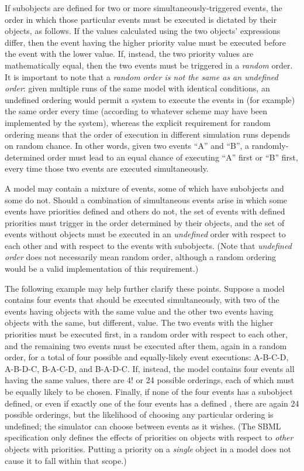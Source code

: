 If \Priority subobjects are defined for two or more
simultaneously-triggered events, the order in which those particular
events must be executed is dictated by their \Priority objects,
as follows.  If the values calculated using the two \Priority
objects'  expressions differ, then the event having
the higher priority value must be executed before the event with
the lower value.  If, instead, the two priority values are
mathematically equal, then the two events must be triggered in a
\emph{random} order.  It is important to note that a \emph{random
  order is not the same as an undefined order}: given multiple
runs of the same model with identical conditions, an undefined
ordering would permit a system to execute the events in (for
example) the same order every time (according to whatever scheme
may have been implemented by the system), whereas the explicit
requirement for random ordering means that the order of execution
in different simulation runs depends on random chance.  In other
words, given two events ``A'' and ``B'', a randomly-determined
order must lead to an equal chance of executing ``A'' first or
``B'' first, every time those two events are executed
simultaneously.

A model may contain a mixture of events, some of which have
\Priority subobjects and some do not.  Should a combination of
simultaneous events arise in which some events have priorities
defined and others do not, the set of events with defined
priorities must trigger in the order determined by their \Priority
objects, and the set of events without \Priority objects must be
executed in an \emph{undefined} order with respect to each other
and with respect to the events with \Priority subobjects.  (Note
that \emph{undefined order} does not necessarily mean random
order, although a random ordering would be a valid implementation
of this requirement.)

The following example may help further clarify these points.
Suppose a model contains four events that should be executed
simultaneously, with two of the events having \Priority objects
with the same value and the other two events having \Priority
objects with the same, but different, value.  The two events with
the higher priorities must be executed first, in a random order
with respect to each other, and the remaining two events must be
executed after them, again in a random order, for a total of four
possible and equally-likely event executions: A-B-C-D, A-B-D-C,
B-A-C-D, and B-A-D-C.  If, instead, the model contains four events
all having the same \Priority values, there are 4! or 24
possible orderings, each of which must be equally likely to be
chosen.  Finally, if none of the four events has a \Priority
subobject defined, or even if exactly one of the four events has a
defined \Priority, there are again 24 possible orderings, but the
likelihood of choosing any particular ordering is undefined; the
simulator can choose between events as it wishes.  (The SBML
specification only defines the effects of priorities on \Event
objects with respect to \emph{other} \Event objects with
priorities.  Putting a priority on a \emph{single} \Event object
in a model does not cause it to fall within that scope.)

